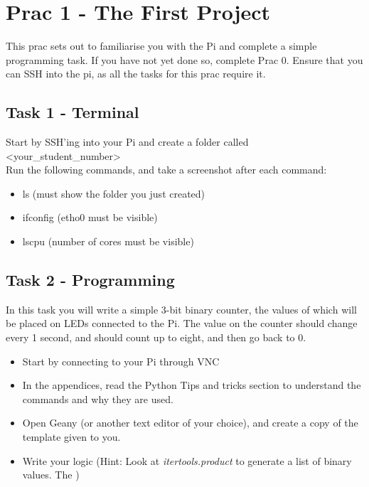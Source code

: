 \section{Prac 1 - The First Project}
This prac sets out to familiarise you with the Pi and complete a simple programming task. If you have not yet done so, complete Prac 0. Ensure that you can SSH into the pi, as all the tasks for this prac require it.

\subsection{Task 1 - Terminal}
Start by SSH'ing into your Pi and create a folder called \textless your\_student\_number\textgreater\\
Run the following commands, and take a screenshot after each command:
\begin{itemize}
    \item ls (must show the folder you just created)
    \item ifconfig (etho0 must be visible)
    \item lscpu (number of cores must be visible)
\end{itemize}

\subsection{Task 2 - Programming}
In this task you will write a simple 3-bit binary counter, the values of which will be placed on LEDs connected to the Pi. The value on the counter should change every 1 second, and should count up to eight, and then go back to 0.
\begin{itemize}
    \item Start by connecting to your Pi through VNC
    \item In the appendices, read the Python Tips and tricks section to understand the commands and why they are used.
    \item Open Geany (or another text editor of your choice), and create a copy of the template given to you. 
    \item Write your logic (Hint: Look at \textit{itertools.product} to generate a list of binary values. The )
\end{itemize}

